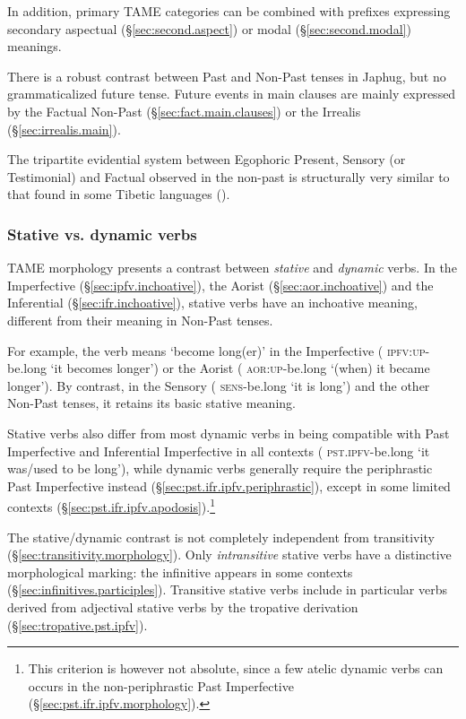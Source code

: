 In addition, primary TAME categories can be combined with prefixes expressing secondary aspectual (§\ref{sec:second.aspect}) or modal (§\ref{sec:second.modal}) meanings.

There is a robust contrast between Past and Non-Past tenses in Japhug, but no grammaticalized future tense. Future events in main clauses are mainly expressed by the Factual Non-Past (§\ref{sec:fact.main.clauses}) or the Irrealis (§\ref{sec:irrealis.main}).
 
The tripartite evidential system between Egophoric Present, Sensory (or Testimonial)  and Factual observed in the non-past is structurally very similar to that found in some Tibetic languages (\citealt{tournadre08conjunct, hill17evidential}).


\subsubsection{Stative vs. dynamic verbs}
 
TAME morphology presents a contrast between \textit{stative} and \textit{dynamic} verbs. In the  Imperfective (§\ref{sec:ipfv.inchoative}), the Aorist (§\ref{sec:aor.inchoative}) and the Inferential (§\ref{sec:ifr.inchoative}), stative verbs have an inchoative meaning, different from their meaning in Non-Past tenses.

For example, the verb  means `become long(er)' in the Imperfective ( \textsc{ipfv}:\textsc{up}-be.long `it becomes longer') or the Aorist ( \textsc{aor}:\textsc{up}-be.long `(when) it became longer'). By contrast, in the Sensory ( \textsc{sens}-be.long `it is long') and the other Non-Past tenses, it retains its basic stative meaning.

Stative verbs also differ from most dynamic verbs in being compatible with Past Imperfective and Inferential Imperfective in all contexts ( \textsc{pst}.\textsc{ipfv}-be.long `it was/used to be long'), while dynamic verbs generally require the periphrastic Past Imperfective instead (§\ref{sec:pst.ifr.ipfv.periphrastic}), except in some limited contexts (§\ref{sec:pst.ifr.ipfv.apodosis}).\footnote{This criterion is however not absolute, since a few atelic dynamic verbs can occurs in the non-periphrastic Past Imperfective (§\ref{sec:pst.ifr.ipfv.morphology}). }

The stative/dynamic contrast is not completely independent from transitivity (§\ref{sec:transitivity.morphology}). Only \textit{intransitive} stative verbs have a distinctive morphological marking: the  infinitive  appears in some contexts (§\ref{sec:infinitives.participles}). Transitive stative verbs include in particular verbs derived from adjectival stative verbs by the tropative derivation (§\ref{sec:tropative.pst.ipfv}).

